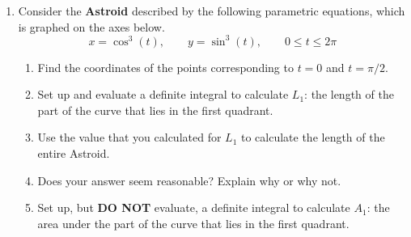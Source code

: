 \begin{enumerate}



\vfill
\item Consider the \textbf{Astroid} described by the following parametric equations, which is graphed on the axes below.
\[
x=\cos^3(t), \qquad y =\sin^3(t), \qquad 0\leq t\leq 2\pi
\]

\begin{enumerate}
\item Find the coordinates of the points corresponding to \(t=0\) and \(t=\pi/2\).
\item Set up and evaluate a definite integral to calculate \(L_1\): the length of the part of the curve that lies in the first quadrant.
\item Use the value that you calculated for \(L_1\) to calculate the length of the entire Astroid.
\item Does your answer seem reasonable? Explain why or why not.
\item Set up, but \textbf{DO NOT} evaluate, a definite integral to calculate \(A_1\): the area under the part of the curve that lies in the first quadrant.
\end{enumerate}



\end{enumerate}



